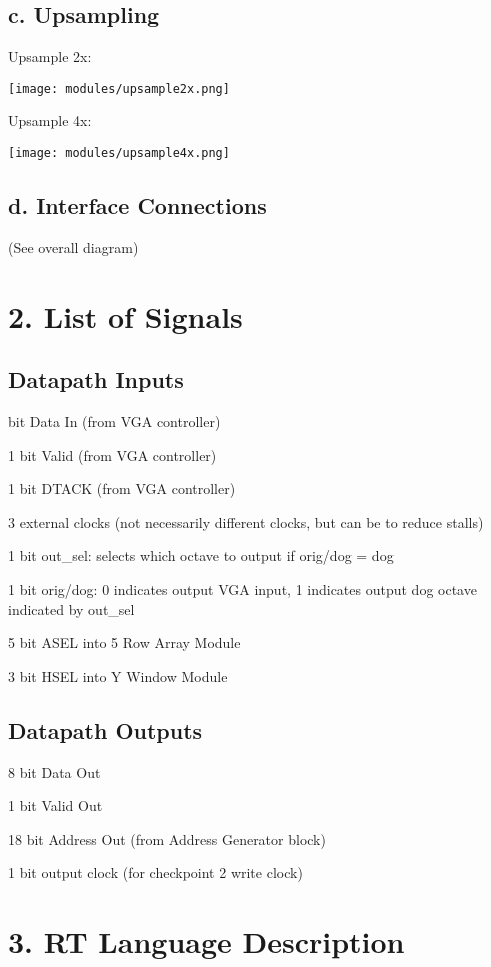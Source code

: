 \documentclass[11pt]{article}
\begin{document}
\subsection*{c. Upsampling}

Upsample 2x:

\noindent\texttt{[image: modules/upsample2x.png]}

Upsample 4x:

\noindent\texttt{[image: modules/upsample4x.png]}

\subsection*{d. Interface Connections}

(See overall diagram)

\section*{2. List of Signals}

\subsection*{Datapath Inputs}

 bit Data In (from VGA controller)

1 bit Valid  (from VGA controller)

1 bit DTACK (from VGA controller)

3 external clocks (not necessarily different clocks, but can be to reduce stalls)

1 bit out\_sel: selects which octave to output if orig/dog = dog

1 bit orig/dog: 0 indicates output VGA input, 1 indicates output dog octave indicated by out\_sel

5 bit ASEL into 5 Row Array Module

3 bit HSEL into Y Window Module

\subsection*{Datapath Outputs}

8 bit Data Out

1 bit Valid Out

18 bit Address Out (from Address Generator block)

1 bit output clock (for checkpoint 2 write clock)

\section*{3. RT Language Description}
\end{document}
